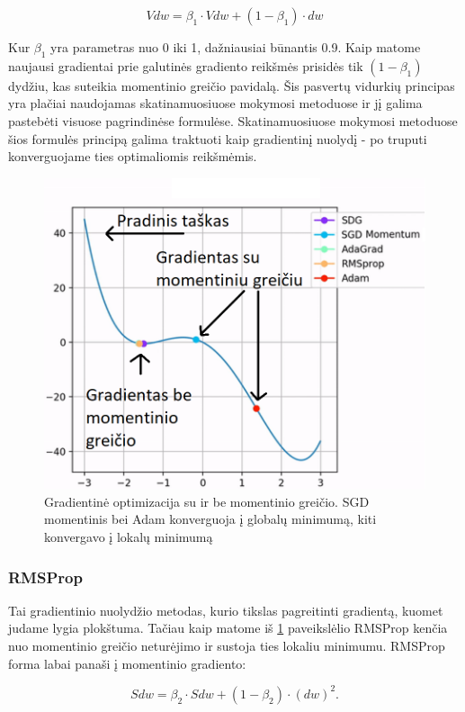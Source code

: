 \documentclass[a4paper, 12pt]{article}
\begin{document}
\begin{equation}
V d w=\beta_{1} \cdot V d w+\left(1-\beta_{1}\right) \cdot d w
\end{equation}

Kur $\beta_1$ yra parametras nuo 0 iki 1, dažniausiai būnantis 0.9. Kaip matome naujausi gradientai prie galutinės gradiento reikšmės prisidės tik $(1-\beta_1)$ dydžiu, kas suteikia momentinio greičio pavidalą. Šis pasvertų vidurkių principas yra plačiai naudojamas skatinamuosiuose mokymosi metoduose ir jį galima pastebėti visuose pagrindinėse formulėse. Skatinamuosiuose mokymosi metoduose šios formulės principą galima traktuoti kaip gradientinį nuolydį - po truputi konverguojame ties optimaliomis reikšmėmis.

\begin{figure}[h]
\centering
\includegraphics[width=.7\textwidth]{momentinisGreitis}
\caption{Gradientinė optimizacija su ir be momentinio greičio. SGD momentinis bei Adam konverguoja į globalų minimumą, kiti konvergavo į lokalų minimumą}
\label{momentinisGreitis}
\end{figure}

%
\subsubsection{RMSProp}
%

Tai gradientinio nuolydžio metodas, kurio tikslas pagreitinti gradientą, kuomet judame lygia plokštuma. Tačiau kaip matome iš \ref{momentinisGreitis} paveikslėlio RMSProp kenčia nuo momentinio greičio neturėjimo ir sustoja ties lokaliu minimumu. RMSProp forma labai panaši į momentinio gradiento:

\begin{equation}
S d w=\beta_{2} \cdot S d w+\left(1-\beta_{2}\right) \cdot (d w)^{2}.
\end{equation}
\end{document}
